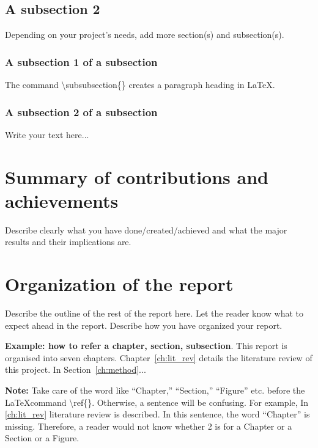 \subsection{A subsection 2}
\label{sec:intro_some_sub2}
Depending on your project's needs, add more section(s) and subsection(s).

\subsubsection{A subsection 1 of a subsection}
\label{sec:intro_some_subsub1}
The command \textbackslash subsubsection\{\} creates a paragraph heading in \LaTeX.

\subsubsection{A subsection 2 of a subsection}
\label{sec:intro_some_subsub2}
Write your text here...

\section{Summary of contributions and achievements} %
\label{sec:intro_sum_results} %
Describe clearly what you have done/created/achieved and what the major results and their implications are. 


\section{Organization of the report} %
\label{sec:intro_org} %
Describe the outline of the rest of the report here. Let the reader know what to expect ahead in the report. Describe how you have organized your report. 

\textbf{Example: how to refer a chapter, section, subsection}. This report is organised into seven chapters. Chapter~\ref{ch:lit_rev} details the literature review of this project. In Section~\ref{ch:method}...  %

\textbf{Note:}  Take care of the word like ``Chapter,'' ``Section,'' ``Figure'' etc. before the \LaTeX command \textbackslash ref\{\}. Otherwise, a  sentence will be confusing. For example, In \ref{ch:lit_rev} literature review is described. In this sentence, the word ``Chapter'' is missing. Therefore, a reader would not know whether 2 is for a Chapter or a Section or a Figure.